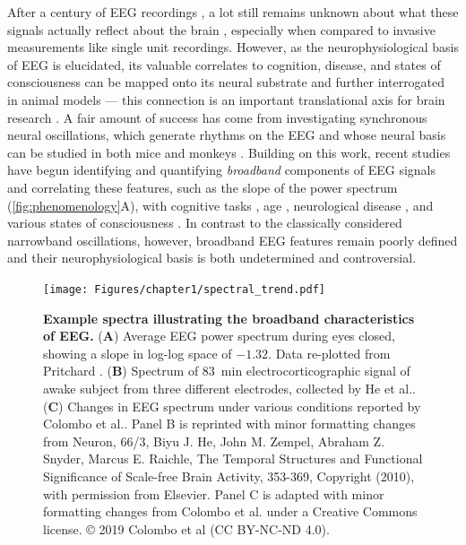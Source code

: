 After a century of EEG recordings \cite{Berger1929}, a lot still remains unknown about what these signals actually reflect about the brain \cite{Cohen2017}, especially when compared to invasive measurements like single unit recordings. However, as the neurophysiological basis of EEG is elucidated, its valuable correlates to cognition, disease, and states of consciousness can be mapped onto its neural substrate and further interrogated in animal models --- this connection is an important translational axis for brain research \cite{da2013eeg}. A fair amount of success has come from investigating synchronous neural oscillations, which generate rhythms on the EEG and whose neural basis can be studied in both mice and monkeys \cite{Buzsaki2004}. Building on this work, recent studies have begun identifying and quantifying \textit{broadband} components of EEG signals and correlating these features, such as the slope of the power spectrum (\autoref{fig:phenomenology}A), with cognitive tasks \cite{Ouyang2020,Podvalny2015,He2010,Waschke2021}, age \cite{Voytek2015}, neurological disease \cite{Wang2022, Pertermann2019, Schaworonkow2021, OSTLUND2021100931, MOLINA2020562, Robertson2019, Roche2019}, and various states of consciousness \cite{Colombo2019, Stock2020, Lendner2020, MUTHUKUMARASWAMY2018582}. In contrast to the classically considered narrowband oscillations, however, broadband EEG features remain poorly defined and their neurophysiological basis is both undetermined and controversial. 

\begin{figure}[b!]
    \centering
    \texttt{[image: Figures/chapter1/spectral\_trend.pdf]}
    
    \caption[Example spectra illustrating the broadband characteristics of EEG.]{\textbf{Example spectra illustrating the broadband characteristics of EEG.} 
    (\textbf{A}) Average EEG power spectrum during eyes closed, showing a slope in log-log space of $-1.32$. Data re-plotted from Pritchard \cite{Pritchard1992}. (\textbf{B}) Spectrum of \qty{83}{\minute} electrocorticographic signal of awake subject from three different electrodes, collected by He et al.\cite{He2010}.  (\textbf{C}) Changes in EEG spectrum under various conditions reported by Colombo et al.\cite{Colombo2019}. Panel B is reprinted with minor formatting changes from Neuron, 66/3, Biyu J. He, John M. Zempel, Abraham Z. Snyder, Marcus E. Raichle, The Temporal Structures and Functional Significance of Scale-free Brain Activity, 353-369, Copyright (2010), with permission from Elsevier. Panel C is adapted with minor formatting changes from Colombo et al. \cite{Colombo2019} under a Creative Commons license. © 2019 Colombo et al (CC BY-NC-ND 4.0).
    } 
    \label{fig:phenomenology}
\end{figure}

